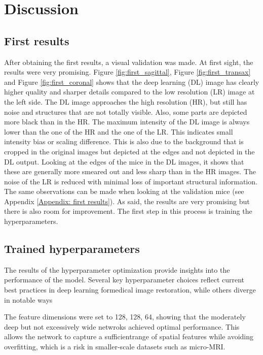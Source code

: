 \documentclass[twocolumn]{article}
\begin{document}
\section{Discussion}
\subsection{First results}
After obtaining the first results, a visual validation was made. At first sight, the results were very promising. 
Figure \ref{fig:first_sagittal}, Figure \ref{fig:first_transax} and Figure \ref{fig:first_coronal} shows that the deep learning (DL) image has clearly higher quality and sharper details compared to the low resolution (LR) image at the left side. 
The DL image approaches the high resolution (HR), but still has noise and structures that are not totally visible. 
Also, some parts are depicted more black than in the HR.
The maximum intensity of the DL image is always lower than the one of the HR and the one of the LR. 
This indicates small intensity bias or scaling difference. This is also due to the background that is cropped in the original images but depicted at the edges and not depicted in the DL output. 
Looking at the edges of the mice in the DL images, it shows that these are generally more smeared out and less sharp than in the HR images. 
The noise of the LR is reduced with minimal loss of important structural information. 
The same observations can be made when looking at the validation mice (see Appendix \ref{Appendix: first results}).
As said, the results are very promising but there is also room for improvement. The first step in this process is training the hyperparameters. 

\subsection{Trained hyperparameters}
The results of the hyperparameter optimization provide insights into the performance of the model. 
Several key hyperparameter choices reflect current best practices in deep learning formedical image restoration, while others diverge in notable ways

The feature dimensions were set to 128, 128, 64, showing that the moderately deep but not excessively wide netwroks achieved optimal performance. 
This allows the network to capture a sufficientrange of spatial features while avoiding overfitting, which is a risk in smaller-scale datasets such as micro-MRI.
\end{document}
